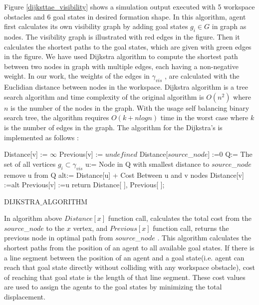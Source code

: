 Figure \ref{dijksttae_visibility} shows a simulation output executed with 5 workspace obstacles and 6 goal states in desired formation shape. In this algorithm, agent first calculates its own visibility graph by adding goal states $g_i \in G$ in graph as nodes. The visibility graph is illustrated with red edges in the figure. Then it calculates the shortest paths to the goal states, which are given with green edges in the figure. We have used Dijkstra algorithm to compute the shortest path between two nodes in graph with multiple edges, each having a non-negative weight. In our work, the weights of the edges in $\gamma_{vis}$ , are calculated with the Euclidian distance between nodes in the workspace. Dijkstra algorithm is a tree search algorithm and time complexity of the original algorithm is $O(n^2)$ where $n$ is the number of the nodes in the graph. With the usage self balancing binary search tree, the algorithm requires $O(k+nlogn)$ time in the worst case where $k$ is the number of edges in the graph. The algorithm for the Dijkstra's is implemented as follows \cite{92}:
\newpage
	
\begin{algorithm}[H]
{		
Distance[v] := $\infty$ \;
Previous[v] := $undefined$ \;
}
Distance[$source$\_$ node$] :=0  \;
Q:= The set of all vertices $g_i \subset \gamma_{vis}$ \;
{
u:= Node in Q with smallest distance to $source$\_$ node$\;
remove u from Q\;
{
alt:= Distance[u] + Cost Between u and v nodes\;
{
Distance[v] :=alt\;
Previous[v] :=u\;
}
}
}
return Distance[ ], Previous[ ]; \newline
\caption{DIJKSTRA$\_$ALGORITHM}
\end{algorithm}

In algorithm above $Distance[x]$ function call, calculates the total cost from the $source$\_$ node$ to the $x$ vertex, and $Previous[x]$ function call, returns the previous node in optimal path from $source$\_$ node$ . This algorithm calculates the shortest paths from the position of an agent to all available goal states. If there is a line segment between the position of an agent and a goal state(i.e. agent can reach that goal state directly without colliding with any workspace obstacle), cost of reaching that goal state is the length of that line segment. These cost values are used to assign the agents to the goal states by minimizing the total displacement.  

